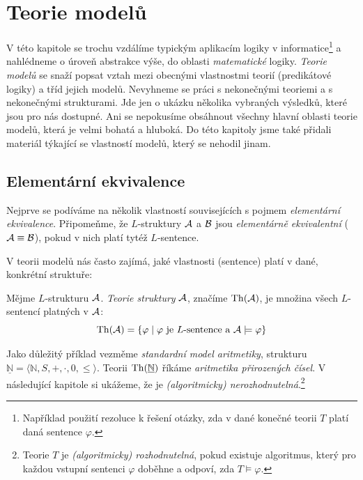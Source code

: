 \chapter{Teorie modelů}\label{chapter:model-theory}

V této kapitole se trochu vzdálíme typickým aplikacím logiky v informatice\footnote{Například použití rezoluce k řešení otázky, zda v dané konečné teorii $T$ platí daná sentence $\varphi$.} a nahlédneme o úroveň abstrakce výše, do oblasti \emph{matematické} logiky. \emph{Teorie modelů} se snaží popsat vztah mezi obecnými vlastnostmi teorií (predikátové logiky) a tříd jejich modelů. Nevyhneme se práci s nekonečnými teoriemi a s nekonečnými strukturami. Jde jen o ukázku několika vybraných výsledků, které jsou pro nás dostupné. Ani se nepokusíme obsáhnout všechny hlavní oblasti teorie modelů, která je velmi bohatá a hluboká. Do této kapitoly jsme také přidali materiál týkající se vlastností modelů, který se nehodil jinam.


\section{Elementární ekvivalence}

Nejprve se podíváme na několik vlastností souvisejících s pojmem \emph{elementární ekvivalence}. Připomeňme, že $L$-struktury $\mathcal{A}$ a $\mathcal{B}$ jsou \emph{elementárně ekvivalentní} ($\mathcal{A}\equiv \mathcal{B}$), pokud v nich platí tytéž $L$-sentence.

V teorii modelů nás často zajímá, jaké vlastnosti (sentence) platí v dané, konkrétní struktuře:

\begin{definition}
Mějme $L$-strukturu $\mathcal{A}$. \emph{Teorie struktury} $\mathcal{A}$, značíme $\operatorname{Th}(\mathcal{A})$, je množina všech $L$-sentencí platných v $\mathcal{A}$:
$$
\operatorname{Th}(\mathcal{A})=\{\varphi\mid\varphi\text{ je $L$-sentence a }\mathcal{A}\models\varphi\}
$$
\end{definition}

\begin{example}
Jako důležitý příklad vezměme \emph{standardní model aritmetiky}, strukturu $\underline{\mathbb{N}}=\langle\mathbb{N},S,+,\cdot,0,\le\rangle$. Teorii $\operatorname{Th}(\underline{\mathbb{N}})$ říkáme \emph{aritmetika přirozených čísel}. V následující kapitole si ukážeme, že je \emph{(algoritmicky) nerozhodnutelná}.\footnote{Teorie $T$ je \emph{(algoritmicky) rozhodnutelná}, pokud existuje algoritmus, který pro každou vstupní sentenci $\varphi$ doběhne a odpoví, zda $T\models\varphi$.}
\end{example}

